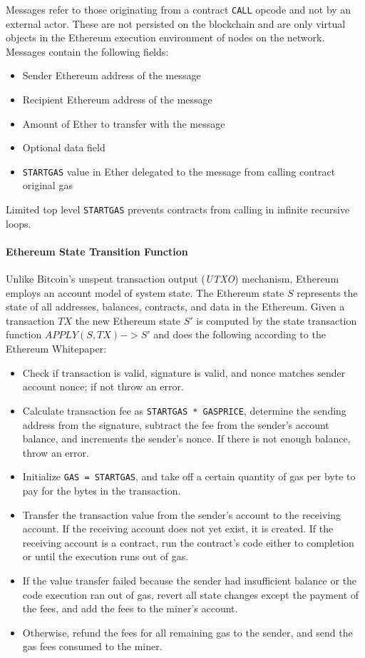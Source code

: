 \documentclass[a4paper,12pt]{article} %
\def\code#1{\texttt{#1}}
\begin{document}
Messages refer to those originating from a contract \code{CALL} opcode and not by an external actor. These are not persisted on the blockchain and are only virtual objects in the Ethereum execution environment of nodes on the network. Messages contain the following fields:

\begin{itemize}
	\item Sender Ethereum address of the message
	\item Recipient Ethereum address of the message
	\item Amount of Ether to transfer with the message
	\item Optional data field
	\item \code{STARTGAS} value in Ether delegated to the message from calling contract original gas
\end{itemize}

Limited top level \code{STARTGAS} prevents contracts from calling in infinite recursive loops.

\paragraph*{Ethereum State Transition Function}

Unlike Bitcoin's unspent transaction output (\textit{UTXO}) mechanism, Ethereum employs an account model of system state. The Ethereum state $S$ represents the state of all addresses, balances, contracts, and data in the Ethereum. Given a transaction $TX$ the new Ethereum state $S'$ is computed by the state transaction function $APPLY(S,TX) -> S'$ and does the following according to the Ethereum Whitepaper\cite{whitepaper}:

\begin{itemize}
	\item Check if transaction is valid, signature is valid, and nonce matches sender account nonce; if not throw an error.
	\item Calculate transaction fee as \code{STARTGAS * GASPRICE}, determine the sending address from the signature, subtract the fee from the sender's account balance, and increments the sender's nonce. If there is not enough balance, throw an error.
	\item Initialize \code{GAS = STARTGAS}, and take off a certain quantity of gas per byte to pay for the bytes in the transaction.
	\item Transfer the transaction value from the sender's account to the receiving account. If the receiving account does not yet exist, it is created. If the receiving account is a contract, run the contract's code either to completion or until the execution runs out of gas.
	\item If the value transfer failed because the sender had insufficient balance or the code execution ran out of gas, revert all state changes except the payment of the fees, and add the fees to the miner's account.
	\item Otherwise, refund the fees for all remaining gas to the sender, and send the gas fees consumed to the miner.
\end{itemize}
\end{document}
